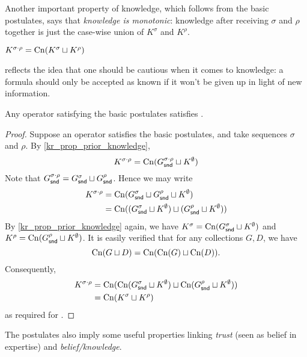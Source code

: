 Another important property of knowledge, which follows from the basic
postulates, says that \emph{knowledge is monotonic}: knowledge after receiving
$\sigma$ and $\rho$ together is just the case-wise union of $K^\sigma$ and
$K^\rho$.

\begin{postulate}[\kconj{}]
    $K^{\sigma \cdot \rho} = \operatorname{Cn}(K^\sigma \sqcup K^\rho)$
\end{postulate}

\kconj{} reflects the idea that one should be cautious when it comes to
knowledge: a formula should only be accepted as known if it won't be given up
in light of new information.

\begin{proposition}
    \label{kr_prop_kconj}
    Any operator satisfying the basic postulates satisfies \kconj{}.
\end{proposition}

\begin{proof}
    Suppose an operator satisfies the basic postulates, and take sequences
    $\sigma$ and $\rho$. By \cref{kr_prop_prior_knowledge},
    \[
        K^{\sigma \cdot \rho}
        =
        \operatorname{Cn}(G^{\sigma \cdot \rho}_{\mathsf{snd}} \sqcup K^\emptyset)
    \]
    Note that $G^{\sigma \cdot \rho}_{\mathsf{snd}} = G^\sigma_{\mathsf{snd}} \sqcup
    G^\rho_{\mathsf{snd}}$. Hence we may write
    \begin{align*}
        K^{\sigma \cdot \rho}
        &= \operatorname{Cn}(G^\sigma_{\mathsf{snd}} \sqcup G^\rho_{\mathsf{snd}} \sqcup K^\emptyset) \\
        &= \operatorname{Cn}((G^\sigma_{\mathsf{snd}} \sqcup K^\emptyset) \sqcup (G^\rho_{\mathsf{snd}} \sqcup K^\emptyset))
    \end{align*}
    By \cref{kr_prop_prior_knowledge} again, we have $K^\sigma = \operatorname{Cn}(G^\sigma_{\mathsf{snd}}
    \sqcup K^\emptyset)$ and $K^\rho = \operatorname{Cn}(G^\rho_{\mathsf{snd}} \sqcup K^\emptyset)$. It
    is easily verified that for any collections $G, D$, we have
    \[
        \operatorname{Cn}(G \sqcup D) = \operatorname{Cn}(\operatorname{Cn}(G) \sqcup \operatorname{Cn}(D)).
    \]
    Consequently,
    \begin{align*}
        K^{\sigma \cdot \rho}
        &= \operatorname{Cn}(\operatorname{Cn}(G^\sigma_{\mathsf{snd}} \sqcup K^\emptyset) \sqcup \operatorname{Cn}(G^\rho_{\mathsf{snd}} \sqcup K^\emptyset)) \\
        &= \operatorname{Cn}(K^\sigma \sqcup K^\rho)
    \end{align*}
    as required for \kconj{}.
\end{proof}

The postulates also imply some useful properties linking \emph{trust} (seen as
belief in expertise) and \emph{belief/knowledge}.


